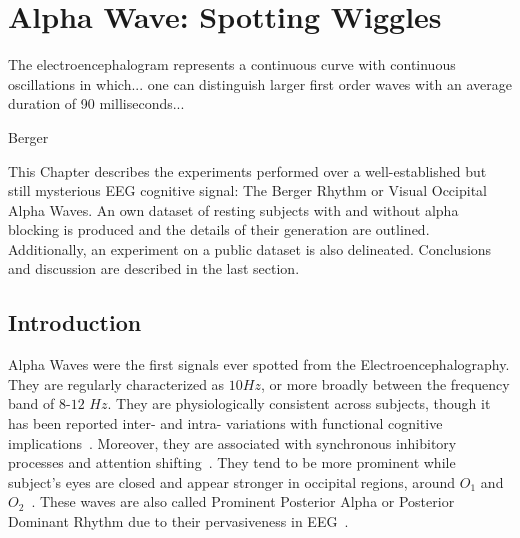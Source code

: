 \chapter{Alpha Wave: Spotting Wiggles}
\label{chapter:four}
\epigraph{The electroencephalogram represents a continuous curve with continuous oscillations in which... one can distinguish larger first order waves with an average duration of 90 milliseconds...}{Berger}

This Chapter describes the experiments performed over a well-established but still mysterious EEG cognitive signal: The Berger Rhythm or Visual Occipital Alpha Waves.  An own dataset of resting subjects with and without alpha blocking is produced and the details of their generation are outlined.  Additionally, an experiment on a public dataset is also delineated.  Conclusions and discussion are described in the last section.

\section{Introduction}


Alpha Waves were the first signals ever spotted from the Electroencephalography.  They are regularly characterized as $10\si{Hz}$, or more broadly between the frequency band of $8$-$12$ $\si{Hz}$. They are physiologically consistent across subjects, though it has been reported inter- and intra- variations with functional cognitive implications~\cite{Haegens2014}.   Moreover, they are associated with synchronous inhibitory processes and attention shifting~\cite{c3}. They tend to be more prominent while subject's eyes are closed and appear stronger in occipital regions, around $O_1$ and $O_2$~\cite{WolpawJonathanR2012,Stopczynski2014}. These waves are also called Prominent Posterior Alpha or Posterior Dominant Rhythm due to their pervasiveness in EEG~\cite{Schomer2010,Haegens2014}.

